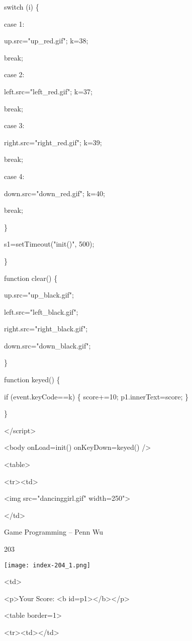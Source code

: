 \documentclass[
]{article}
\begin{document}
switch (i) \{

case 1:

up.src="up\_red.gif"; k=38;

break;

case 2:

left.src="left\_red.gif"; k=37;

break;

case 3:

right.src="right\_red.gif"; k=39;

break;

case 4:

down.src="down\_red.gif"; k=40;

break;

\}

s1=setTimeout("init()", 500);

\}

function clear() \{

up.src="up\_black.gif";

left.src="left\_black.gif";

right.src="right\_black.gif";

down.src="down\_black.gif";

\}

function keyed() \{

if (event.keyCode==k) \{ score+=10; p1.innerText=score; \}

\}

\textless/script\textgreater{}

\textless body onLoad=init() onKeyDown=keyed() /\textgreater{}

\textless table\textgreater{}

\textless tr\textgreater\textless td\textgreater{}

\textless img src="dancinggirl.gif" width=250"\textgreater{}

\textless/td\textgreater{}

Game Programming -- Penn Wu

203

\protect\hypertarget{index_split_011.htmlux5cux23p204}{}{}\texttt{[image: index-204\_1.png]}

\textless td\textgreater{}

\textless p\textgreater Your Score: \textless b
id=p1\textgreater\textless/b\textgreater\textless/p\textgreater{}

\textless table border=1\textgreater{}

\textless tr\textgreater\textless td\textgreater\textless/td\textgreater{}
\end{document}
